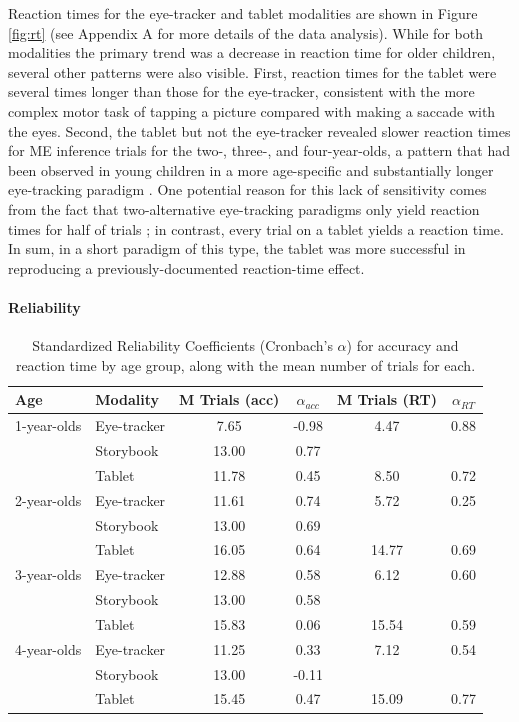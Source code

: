 \documentclass[man,noapacite]{apa2}
\begin{document}
Reaction times for the eye-tracker and tablet modalities are shown in Figure \ref{fig:rt} (see Appendix A for more details of the data analysis). While for both modalities the primary trend was a decrease in reaction time for older children, several other patterns were also visible. First, reaction times for the tablet were several times longer than those for the eye-tracker, consistent with the more complex motor task of tapping a picture compared with making a saccade with the eyes. Second, the tablet but not the eye-tracker revealed slower reaction times for ME inference trials for the two-, three-, and four-year-olds, a pattern that had been observed in young children in a more age-specific and substantially longer eye-tracking paradigm \cite{bion2013}. One potential reason for this lack of sensitivity comes from the fact that two-alternative eye-tracking paradigms only yield reaction times for half of trials \cite{fernald2008}; in contrast, every trial on a tablet yields a reaction time. In sum, in a short paradigm of this type, the tablet was more successful in reproducing a previously-documented reaction-time effect.

\paragraph{Reliability}

\begin{table}[t]
\centering
\caption{\label{tab:reliability} Standardized Reliability Coefficients (Cronbach's $\alpha$)  for accuracy and reaction time by age group, along with the mean number of trials for each.}
\begin{tabular}{llcccc}
  \hline
Age & Modality & M Trials (acc) & $\alpha_{acc}$ & M Trials (RT) & $\alpha_{RT}$ \\ 
  \hline
1-year-olds & Eye-tracker & 7.65 & -0.98 & 4.47 & 0.88\\ 
    & Storybook & 13.00 & 0.77 & & \\ 
    & Tablet & 11.78 & 0.45 & 8.50 & 0.72\\ 
2-year-olds & Eye-tracker & 11.61 & 0.74 & 5.72 & 0.25 \\ 
    & Storybook & 13.00 & 0.69 & & \\ 
    & Tablet & 16.05 & 0.64 & 14.77 & 0.69\\ 
3-year-olds & Eye-tracker & 12.88 & 0.58 & 6.12 & 0.60\\ 
    & Storybook & 13.00 & 0.58 & & \\ 
    & Tablet & 15.83 & 0.06 & 15.54 & 0.59 \\ 
4-year-olds & Eye-tracker & 11.25 & 0.33  & 7.12 & 0.54 \\ 
    & Storybook & 13.00 & -0.11& &  \\ 
    & Tablet & 15.45 & 0.47 & 15.09 & 0.77 \\ 
   \hline
\end{tabular}
\end{table}
\end{document}

